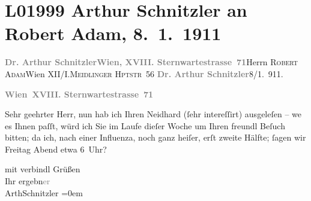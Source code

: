 

\section[Arthur Schnitzler an Robert Adam, 8. 1. 1911]{L01999 Arthur Schnitzler an Robert Adam, 8. 1. 1911}
\nopagebreak{}
\rehead{ }\normalsize\beginnumbering{}
\toendnotes[C]{\smallbreak\pagebreak[2]}
\pstart{}{\pb}\textcolor{gray}{\textbf{Dr. Arthur Schnitzler}}\pend{}\pstart{}\textcolor{gray}{\textbf{Wien, XVIII. Sternwartestrasse 71}}\pend{}{\bigskip}\pstart{}{\pb}Herrn \textsc{Robert Adam}\pend{}\pstart{}Wien XII/I.\pend{}\pstart{}\textsc{Meidlinger Hptstr} 56\pend{}{\bigskip}\vspace{1em}
\pstart
           {\pb}\textcolor{gray}{\textbf{Dr. Arthur Schnitzler}}\hfill 8/1. 911.\pend
           
\pstart
           \textcolor{gray}{\textbf{Wien XVIII. Sternwartestrasse 71}}\pend
           
\pstart\center{}Sehr geehrter Herr,\pend\vspace{0.5em}
\pstart
           nun hab ich Ihren Neidhard (ſehr intereſſirt)
               ausgeleſen – we{\geminationn} es Ihnen paſſt, würd ich Sie im Laufe
               dieſer Woche um Ihren freundl Beſuch bitten; da ich, nach einer Influenza, {\pb}noch ganz heiſer, erſt zweite Hälfte; ſagen wir
                  Freitag{ }Abend etwa 6 Uhr?\pend
           
\pstart
           mit verbindl Grüßen{\\[\baselineskip]}Ihr ergebn\textcolor{gray}{er}{\\[\baselineskip]}\spacefill\mbox{ArthSchnitzler}\pend
           \leftskip=0em{}\endnumbering{}  
      